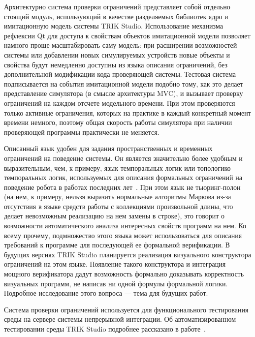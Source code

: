 \documentclass[conference]{IEEEtran}
\begin{document}
Архитектурно система проверки ограничений представляет собой отдельно стоящий модуль, использующий в качестве разделяемых библиотек ядро и имитационную модель системы TRIK Studio. Использование механизма рефлексии Qt для доступа к свойствам объектов имитационной модели позволяет намного проще масштабировать саму модель: при расширении возможностей системы или добавлении новых симулируемых устройств новые объекты и свойства будут немедленно доступны из языка описания ограничений, без дополнительной модификации кода проверяющей системы. Тестовая система подписывается на события имитационной модели подобно тому, как это делает представление симулятора (в смысле архитектуры MVC), и вызывает проверку ограничений на каждом отсчете модельного времени. При этом проверяются только активные ограничения, которых на практике в каждый конкретный момент времени немного, поэтому общая скорость работы симулятора при наличии проверяющей программы практически не меняется.

Описанный язык удобен для задания пространственных и временных ограничений на поведение системы. Он является значительно более удобным и выразительным, чем, к примеру, язык темпоральных логик или топологико-темпоральных логик, используемых для описания формальных ограничений на поведение робота в работах последних лет~\cite{mordvinov2016formal,kress2007s,бугайченко2007разработка,дмитриев2013адаптация}. При этом язык не тьюринг-полон (на нем, к примеру, нельзя выразить нормальные алгоритмы Маркова из-за отсутствия в языке средств работы с коллекциями произвольной длины, что делает невозможным реализацию на нем замены в строке), это говорит о возможности автоматического анализа интересных свойств программ на нем. Ко всему прочему, подмножество этого языка может использоваться для описания требований к программе для последующей ее формальной верификации. В будущих версиях TRIK Studio планируется реализация визуального конструктора ограничений на этом языке. Появление такого конструктора и интеграция мощного верификатора дадут возможность формально доказывать корректность визуальных программ, не написав ни одной формулы формальной логики. Подробное исследование этого вопроса --- тема для будущих работ.

Система проверки ограничений используется для функционального тестирования среды на сервере системы непрерывной интеграции. Об автоматизированном тестировании среды TRIK Studio подробнее рассказано в работе~\cite{mordvinov2016testing}.
\end{document}
